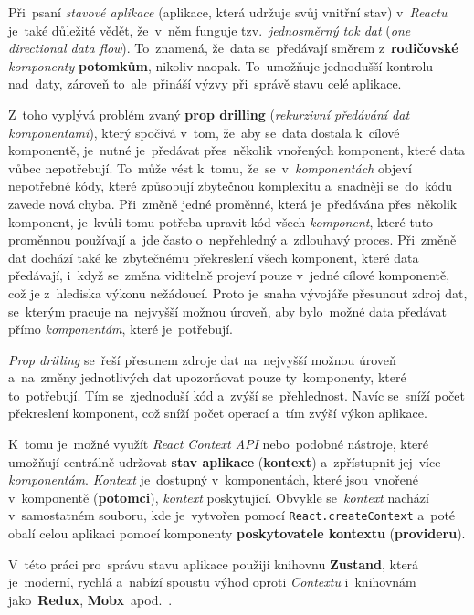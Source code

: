 \documentclass[11pt,a4paper]{report}
\begin{document}
            Při~psaní \emph{stavové aplikace} (aplikace, která udržuje svůj vnitřní stav) v~\emph{Reactu} je~také důležité vědět, že~v~něm funguje tzv.~\emph{jednosměrný tok dat} (\emph{one directional data flow}). To~znamená, že~data se~předávají směrem z~\textbf{rodičovské} \emph{komponenty} \textbf{potomkům}, nikoliv naopak. To~umožňuje jednodušší kontrolu nad~daty, zároveň to~ale~přináší výzvy při~správě stavu celé aplikace.
            
            Z~toho vyplývá problém zvaný \textbf{prop drilling} (\emph{rekurzivní předávání dat komponentami}), který spočívá v~tom, že~aby se~data dostala k~cílové komponentě, je~nutné je~předávat přes~několik vnořených komponent, které data vůbec nepotřebují. To~může vést k~tomu, že~se~v~\emph{komponentách} objeví nepotřebné kódy, které způsobují zbytečnou komplexitu a~snadněji se~do~kódu zavede nová chyba. Při~změně jedné proměnné, která je~předávána přes~několik komponent, je~kvůli tomu potřeba upravit kód všech \emph{komponent}, které tuto proměnnou používají a~jde často o~nepřehledný a~zdlouhavý proces. Při~změně dat dochází také ke~zbytečnému překreslení všech komponent, které data předávají, i~když se~změna viditelně projeví pouze v~jedné cílové komponentě, což je z~hlediska výkonu nežádoucí. Proto je~snaha vývojáře přesunout zdroj dat, se~kterým pracuje na~nejvyšší možnou úroveň, aby bylo~možné data předávat přímo \emph{komponentám}, které je~potřebují.

            \emph{Prop drilling} se~řeší přesunem zdroje dat na~nejvyšší možnou úroveň a~na~změny jednotlivých dat upozorňovat pouze ty~komponenty, které to~potřebují. Tím se~zjednoduší kód a~zvýší se~přehlednost. Navíc se~sníží počet překreslení komponent, což sníží počet operací a~tím zvýší výkon aplikace.
            
            K~tomu je~možné využít \emph{React Context API} nebo~podobné nástroje, které umožňují centrálně udržovat \textbf{stav aplikace} (\textbf{kontext}) a~zpřístupnit jej~více \emph{komponentám}. \emph{Kontext} je~dostupný v~komponentách, které jsou~vnořené v~komponentě (\textbf{potomci}), \emph{kontext} poskytující. Obvykle se~\emph{kontext} nachází v~samostatném souboru, kde je~vytvořen pomocí \texttt{React.createContext} a~poté obalí celou aplikaci pomocí komponenty \textbf{poskytovatele kontextu} (\textbf{provideru}).
            
            V~této práci pro~správu stavu aplikace použiji knihovnu \textbf{Zustand}, která je~moderní, rychlá a~nabízí spoustu výhod oproti \emph{Contextu} i~knihovnám jako~\textbf{Redux}, \textbf{Mobx}~apod.~\cite{openreplayReactState}.
\end{document}
